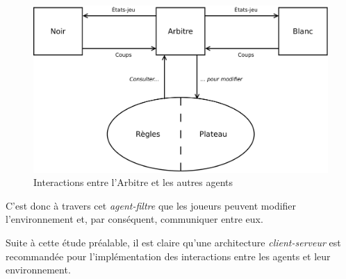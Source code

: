 \begin{figure}[H] 
\centering
\includegraphics[width=\textwidth]{files/env/arbitre} 
\caption{Interactions entre l'Arbitre et les autres agents} 
\label{arbitre}
\end{figure}

C'est donc à travers cet \emph{agent-filtre} que les joueurs peuvent modifier l'environnement et, par conséquent, communiquer entre eux.

Suite à cette étude préalable, il est claire qu'une architecture \emph{client-serveur} est recommandée pour l'implémentation des interactions entre les agents et leur environnement.